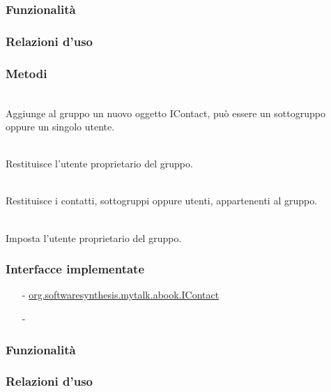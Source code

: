 \subsubsection*{Funzionalità}

\subsubsection*{Relazioni d'uso}

\subsubsection*{Metodi}
\begin{description}
	\item{}\\
Aggiunge al gruppo un nuovo oggetto IContact, può essere un sottogruppo oppure un singolo utente.
	\item{}\\
Restituisce l'utente proprietario del gruppo.
	\item{}\\
Restituisce i contatti, sottogruppi oppure utenti, appartenenti al gruppo.
	\item{}\\
Imposta l'utente proprietario del gruppo.
\end{description}


\subsubsection*{Interfacce implementate}
\begin{itemize}[noitemsep,nolistsep]
  \item[-] \hyperref[IContact]{\ttfamily{}org.softwaresynthesis.mytalk.abook.IContact}
  \item[-] 
\end{itemize}

\subsubsection*{Funzionalità}

\subsubsection*{Relazioni d'uso}

